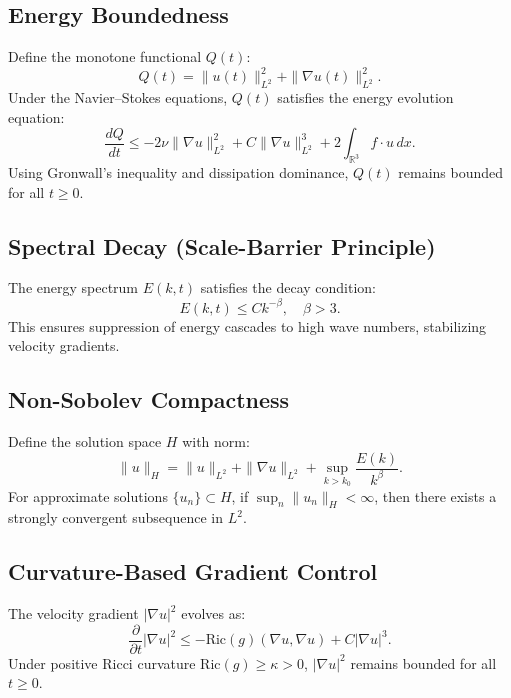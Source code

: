 \documentclass[12pt]{article}
\begin{document}
\subsection{Energy Boundedness}
\begin{theorem}
Define the monotone functional $Q(t)$:
\begin{equation}
Q(t) = \|u(t)\|_{L^2}^2 + \|\nabla u(t)\|_{L^2}^2.
\end{equation}
Under the Navier--Stokes equations, $Q(t)$ satisfies the energy evolution equation:
\begin{equation}
\frac{dQ}{dt} \leq -2\nu \|\nabla u\|_{L^2}^2 + C\|\nabla u\|_{L^2}^3 + 2\int_{\mathbb{R}^3} f \cdot u \, dx.
\end{equation}
Using Gronwall's inequality and dissipation dominance, $Q(t)$ remains bounded for all $t \geq 0$.
\end{theorem}

\subsection{Spectral Decay (Scale-Barrier Principle)}
\begin{theorem}
The energy spectrum $E(k, t)$ satisfies the decay condition:
\begin{equation}
E(k, t) \leq Ck^{-\beta}, \quad \beta > 3.
\end{equation}
This ensures suppression of energy cascades to high wave numbers, stabilizing velocity gradients.
\end{theorem}

\subsection{Non-Sobolev Compactness}
\begin{theorem}
Define the solution space $H$ with norm:
\begin{equation}
\|u\|_H = \|u\|_{L^2} + \|\nabla u\|_{L^2} + \sup_{k > k_0} \frac{E(k)}{k^\beta}.
\end{equation}
For approximate solutions $\{u_n\} \subset H$, if $\sup_n \|u_n\|_H < \infty$, then there exists a strongly convergent subsequence in $L^2$.
\end{theorem}

\subsection{Curvature-Based Gradient Control}
\begin{theorem}
The velocity gradient $|\nabla u|^2$ evolves as:
\begin{equation}
\frac{\partial}{\partial t} |\nabla u|^2 \leq -\text{Ric}(g)(\nabla u, \nabla u) + C|\nabla u|^3.
\end{equation}
Under positive Ricci curvature $\text{Ric}(g) \geq \kappa > 0$, $|\nabla u|^2$ remains bounded for all $t \geq 0$.
\end{theorem}
\end{document}
